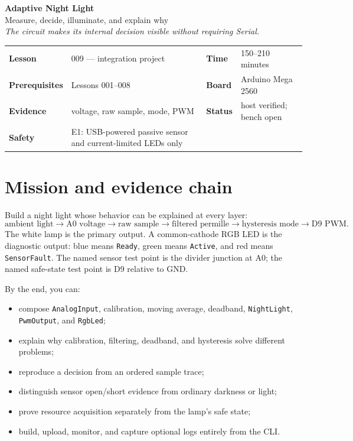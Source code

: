 \documentclass[11pt]{article}
\begin{document}
\begin{center}
  {\Huge\bfseries Adaptive Night Light}\\[4pt]
  {\Large Measure, decide, illuminate, and explain why}\\[8pt]
  \textit{The circuit makes its internal decision visible without requiring Serial.}
\end{center}

\begin{tabularx}{\linewidth}{@{}>{\bfseries}l X >{\bfseries}l X@{}}
Lesson & 009 --- integration project & Time & 150--210 minutes\\
Prerequisites & Lessons 001--008 & Board & Arduino Mega 2560\\
Evidence & voltage, raw sample, mode, PWM & Status & host verified; bench open\\
Safety & E1: USB-powered passive sensor and current-limited LEDs only\\
\end{tabularx}

\section{Mission and evidence chain}

Build a night light whose behavior can be explained at every layer:
\[
\text{ambient light}\rightarrow
\text{A0 voltage}\rightarrow
\text{raw sample}\rightarrow
\text{filtered permille}\rightarrow
\text{hysteresis mode}\rightarrow
\text{D9 PWM}.
\]
The white lamp is the primary output. A common-cathode RGB LED is the diagnostic
output: blue means \texttt{Ready}, green means \texttt{Active}, and red means
\texttt{SensorFault}. The named sensor test point is the divider junction at
A0; the named safe-state test point is D9 relative to GND.

By the end, you can:

\begin{itemize}
  \item compose \texttt{AnalogInput}, calibration, moving average, deadband,
        \texttt{NightLight}, \texttt{PwmOutput}, and \texttt{RgbLed};
  \item explain why calibration, filtering, deadband, and hysteresis solve
        different problems;
  \item reproduce a decision from an ordered sample trace;
  \item distinguish sensor open/short evidence from ordinary darkness or light;
  \item prove resource acquisition separately from the lamp's safe state;
  \item build, upload, monitor, and capture optional logs entirely from the CLI.
\end{itemize}
\end{document}
